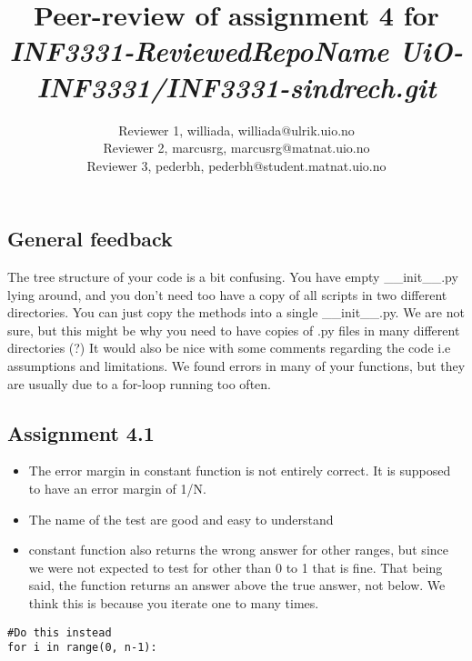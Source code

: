 \documentclass[a4paper]{article}
\title{Peer-review of assignment 4 for \textit{INF3331-ReviewedRepoName UiO-INF3331/INF3331-sindrech.git}}
\author{Reviewer 1, williada, {williada@ulrik.uio.no} \\
 		Reviewer 2, marcusrg, {marcusrg@matnat.uio.no} \\
		Reviewer 3, pederbh, {pederbh@student.matnat.uio.no}}
\begin{document}
\maketitle

\subsection*{General feedback}
The tree structure of your code is a bit confusing. You have empty {\_}{\_}init{\_}{\_}.py lying around, and you don't need too have a copy of all scripts in two different directories. You can just copy the methods into a single {\_}{\_}init{\_}{\_}.py. We are not sure, but this might be why you need to have copies of .py files in many different directories (?) 
It would also be nice with some comments regarding the code i.e assumptions and limitations. We found errors in many of your functions, but they are usually due to a for-loop running too often. 

\subsection*{Assignment 4.1}
\begin{itemize}
  \item The error margin in constant function is not entirely correct. It is supposed to have an error margin of 1/N.
  \item The name of the test are good and easy to understand
 \item  constant function also returns the wrong answer for other ranges, but since we were not expected to test for other than 0 to 1 that is fine. That being said, the function returns an answer above the true answer, not below. We think this is because you iterate one to many times.  
\end{itemize}

\begin{verbatim}
#Do this instead
for i in range(0, n-1):
\end{verbatim}




\end{document}
